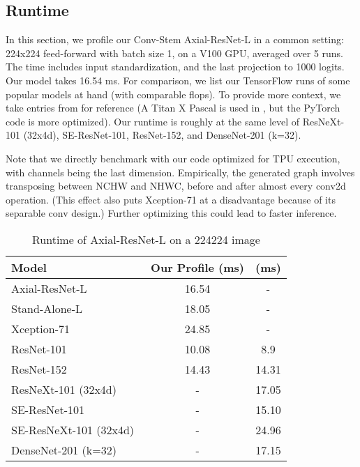 \documentclass[runningheads]{llncs}
\begin{document}
\newpage
\begin{subappendices}
\renewcommand{\thesection}{\Alph{section}}\section{Runtime}
In this section, we profile our Conv-Stem Axial-ResNet-L in a common setting: 224x224 feed-forward with batch size 1, on a V100 GPU, averaged over 5 runs. The time includes input standardization, and the last projection to 1000 logits. Our model takes 16.54 ms. For comparison, we list our TensorFlow runs of some popular models at hand (with comparable flops). To provide more context, we take entries from \cite{bianco2018benchmark} for reference (A Titan X Pascal is used in \cite{bianco2018benchmark}, but the PyTorch code is more optimized). Our runtime is roughly at the same level of ResNeXt-101 (32x4d), SE-ResNet-101, ResNet-152, and DenseNet-201 (k=32).

Note that we directly benchmark with our code optimized for TPU execution, with channels being the last dimension. Empirically, the generated graph involves transposing between NCHW and NHWC, before and after almost every conv2d operation. (This effect also puts Xception-71 at a disadvantage because of its separable conv design.) Further optimizing this could lead to faster inference.

    \begin{table}[t]
    \caption{Runtime of Axial-ResNet-L on a 224224 image}
    \label{tab:runtime}
    \setlength{\tabcolsep}{1.5em}
        \centering
        \begin{tabular}{l|c|c}
        \toprule[0.2em]
            Model & Our Profile (ms) & \cite{bianco2018benchmark} (ms) \\
            \toprule[0.2em]
            Axial-ResNet-L & 16.54 & - \\
            \midrule
            Stand-Alone-L~\cite{parmar2019stand} & 18.05 & - \\
            Xception-71~\cite{chollet2016xception,deeplabv3plus2018} & 24.85 & - \\
            ResNet-101~\cite{he2016deep} & 10.08 & 8.9 \\
            ResNet-152~\cite{he2016deep} & 14.43 & 14.31 \\
            ResNeXt-101 (32x4d)~\cite{xie2017aggregated} & - & 17.05 \\
            SE-ResNet-101~\cite{hu2018squeeze} & - & 15.10 \\
            SE-ResNeXt-101 (32x4d)~\cite{hu2018squeeze} & - & 24.96 \\
            DenseNet-201 (k=32)~\cite{huang2017densely} & - & 17.15 \\
            \bottomrule[0.1em]
        \end{tabular}
    \end{table}
    

\end{subappendices}
\end{document}
